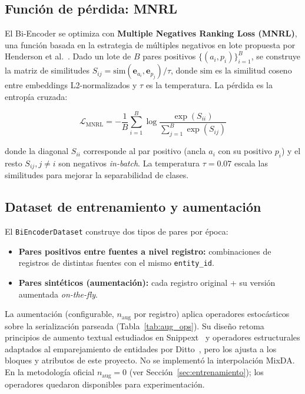 \subsection{Función de pérdida: MNRL}

El Bi-Encoder se optimiza con \textbf{Multiple Negatives Ranking Loss (MNRL)}, una función basada en la estrategia de múltiples negativos en lote propuesta por Henderson et al.~\cite{henderson2017}. Dado un lote de $B$ pares positivos $\{(a_i, p_i)\}_{i=1}^B$, se construye la matriz de similitudes $S_{ij} = \text{sim}(\mathbf{e}_{a_i}, \mathbf{e}_{p_j}) / \tau$, donde $\text{sim}$ es la similitud coseno entre embeddings L2-normalizados y $\tau$ es la temperatura. La pérdida es la entropía cruzada:

\[
\mathcal{L}_{\text{MNRL}} = -\frac{1}{B}\sum_{i=1}^B \log \frac{\exp(S_{ii})}{\sum_{j=1}^B \exp(S_{ij})}
\]

donde la diagonal $S_{ii}$ corresponde al par positivo (ancla $a_i$ con su positivo $p_i$) y el resto $S_{ij}, j \neq i$ son negativos \textit{in-batch}. La temperatura $\tau=0.07$ escala las similitudes para mejorar la separabilidad de clases.

\subsection{Dataset de entrenamiento y aumentación}

El \texttt{BiEncoderDataset} construye dos tipos de pares por época:

\begin{itemize}
    \item \textbf{Pares positivos entre fuentes a nivel registro:} combinaciones de registros de distintas fuentes con el mismo \texttt{entity\_id}.
    \item \textbf{Pares sintéticos (aumentación):} cada registro original + su versión aumentada \textit{on-the-fly}.
\end{itemize}

La aumentación (configurable, $n_{\text{aug}}$ por registro) aplica operadores estocásticos sobre la serialización parseada (Tabla~\ref{tab:aug_ops}). Su diseño retoma principios de aumento textual estudiados en Snippext~\cite{miao2020} y operadores estructurales adaptados al emparejamiento de entidades por Ditto~\cite{li2020}, pero los ajusta a los bloques y atributos de este proyecto. No se implementó la interpolación MixDA. En la metodología oficial $n_{\text{aug}}=0$ (ver Sección~\ref{sec:entrenamiento}); los operadores quedaron disponibles para experimentación.

